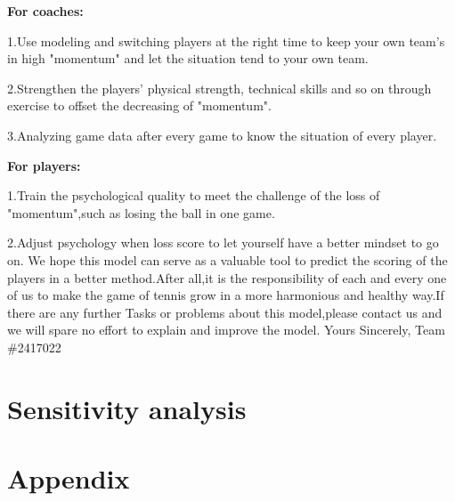\documentclass{article}
\begin{document}
\begin{center}
      \textbf{For coaches:}
\end{center}

1.Use modeling and switching players at the right time to keep your own team's in high "momentum" and let the situation tend to your own team.

2.Strengthen the players' physical strength, technical skills and so on through exercise to offset the decreasing of "momentum".

3.Analyzing game data after every game to know the situation of every player.

\begin{center}
      \textbf{For players:}
\end{center}

1.Train the psychological quality to meet the challenge of the loss of "momentum",such as losing the ball in one game.

2.Adjust psychology when loss score to let yourself have a better mindset to go on.
We hope this model can serve as a valuable tool to predict the scoring of the players in a better method.After all,it is the responsibility of each and every one of us to make the game of tennis grow in a more harmonious and healthy way.If there are any further Tasks or problems about this model,please contact us and we will spare no effort to explain and improve the model.
Yours Sincerely,
Team \#2417022

\section{Sensitivity analysis}


\section{Appendix}
\end{document}
